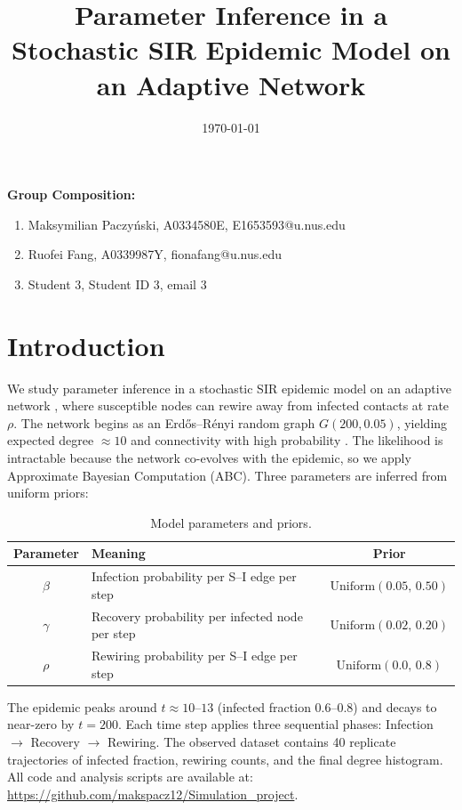 \documentclass[12pt]{article}
\begin{document}
\title{Parameter Inference in a Stochastic SIR Epidemic Model on an Adaptive Network}
\author{}
\date{\today}
\maketitle

{\bf Group Composition:}
\begin{enumerate}
\item Maksymilian Paczyński, A0334580E, E1653593@u.nus.edu
\item Ruofei Fang, A0339987Y, fionafang@u.nus.edu
\item Student 3, Student ID 3, email 3
\end{enumerate}

\section{Introduction}

We study parameter inference in a stochastic SIR epidemic model on an adaptive network \cite{GDB06}, where susceptible nodes can rewire away from infected contacts at rate $\rho$. The network begins as an Erdős–Rényi random graph $G(200, 0.05)$, yielding expected degree $\approx 10$ and connectivity with high probability \cite{Wik24}. The likelihood is intractable because the network co-evolves with the epidemic, so we apply Approximate Bayesian Computation (ABC). Three parameters are inferred from uniform priors:

\begin{table}[h]
\centering
\small
\begin{tabular}{clc}
\toprule
\textbf{Parameter} & \textbf{Meaning} & \textbf{Prior} \\
\midrule
$\beta$ & Infection probability per S--I edge per step & $\mathrm{Uniform}(0.05,\,0.50)$ \\
$\gamma$ & Recovery probability per infected node per step & $\mathrm{Uniform}(0.02,\,0.20)$ \\
$\rho$ & Rewiring probability per S--I edge per step & $\mathrm{Uniform}(0.0,\,0.8)$ \\
\bottomrule
\end{tabular}
\caption{Model parameters and priors.}
\end{table}

\noindent The epidemic peaks around $t \approx 10$--$13$ (infected fraction 0.6--0.8) and decays to near-zero by $t=200$. Each time step applies three sequential phases: Infection $\to$ Recovery $\to$ Rewiring. The observed dataset contains 40 replicate trajectories of infected fraction, rewiring counts, and the final degree histogram. All code and analysis scripts are available at: \url{https://github.com/makspacz12/Simulation_project}.
\end{document}
